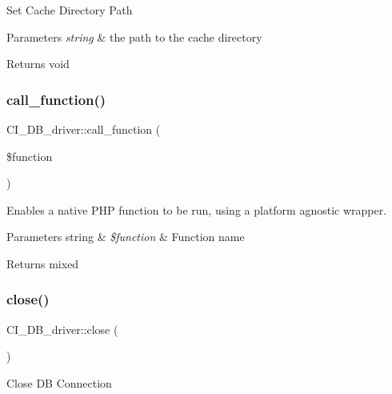 Set Cache Directory Path


\begin{DoxyParams}{Parameters}
{\em string} & the path to the cache directory \\
\hline
\end{DoxyParams}
\begin{DoxyReturn}{Returns}
void 
\end{DoxyReturn}
\mbox{\label{class_c_i___d_b__driver_a3f47277d957abab4cece64f9a344b794}} 
\subsubsection{\texorpdfstring{call\+\_\+function()}{call\_function()}}
{\footnotesize\ttfamily C\+I\+\_\+\+D\+B\+\_\+driver\+::call\+\_\+function (\begin{DoxyParamCaption}\item[{}]{\$function }\end{DoxyParamCaption})}

Enables a native P\+HP function to be run, using a platform agnostic wrapper.


\begin{DoxyParams}[1]{Parameters}
string & {\em \$function} & Function name \\
\hline
\end{DoxyParams}
\begin{DoxyReturn}{Returns}
mixed 
\end{DoxyReturn}
\mbox{\label{class_c_i___d_b__driver_a4ce5f03a40f56cb09bd1f17d6826296e}} 
\subsubsection{\texorpdfstring{close()}{close()}}
{\footnotesize\ttfamily C\+I\+\_\+\+D\+B\+\_\+driver\+::close (\begin{DoxyParamCaption}{ }\end{DoxyParamCaption})}

Close DB Connection

